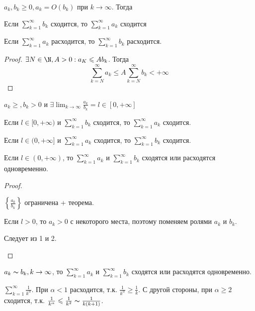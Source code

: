 \begin{Thm}
	$a_k, b_k \geqslant 0, a_k = O(b_k)$ при $k \to \infty$. Тогда
	\begin{MyList}
		\item Если $\sum_{k=1}^{\infty} b_k$ сходится, то $\sum_{k=1}^{\infty} a_k$ сходится
		\item Если $\sum_{k=1}^{\infty} a_k$ расходится, то $\sum_{k=1}^{\infty} b_k$ расходится.    
	\end{MyList} 
\end{Thm}

\begin{proof}
	$\exists N \in \N, A > 0 : a_K \leqslant A b_k$. Тогда
	\[\sum_{k=N}^{\infty} a_k \leqslant A \sum_{k=N}^{\infty} b_k < +\infty\] 
\end{proof}

\begin{Cons}
	$a_k \geqslant, b_k > 0$ и $\exists \lim_{k \to \infty} \frac{a_k}{b_k} = l \in [0, +\infty]$
	\begin{MyList}
		\item Если $l \in [0, +\infty)$ и $\sum_{k=1}^{\infty} b_k$ сходится, то $\sum_{k=1}^{\infty} a_k$ сходится.
		\item Если $l \in (0, +\infty]$ и $\sum_{k=1}^{\infty} a_k$ сходится, то $\sum_{k=1}^{\infty} b_k$ сходится.
		\item Если $l \in (0, +\infty)$, то $\sum_{k=1}^{\infty} a_k$ и $\sum_{k=1}^{\infty} b_k$ сходятся или расходятся одновременно.        
	\end{MyList} 
\end{Cons}

\begin{proof}
	\begin{MyList}
		\item $\left\{ \frac{a_k}{b_k}\right\}$ ограничена + теорема.
		\item Если $l > 0$, то $a_k > 0$ с некоторого места, поэтому поменяем ролями $a_k$ и $b_k$.
		\item Следует из 1 и 2.  
	\end{MyList}
\end{proof}

\begin{Cons}
	$a_k \thicksim b_k, k \to \infty$, то $\sum_{k=1}^{\infty} a_k$ и $\sum_{k=1}^{\infty} b_k$ сходятся или расходятся одновременно.   
\end{Cons}

\begin{Example}
	$\sum_{k=1}^{\infty} \frac{1}{k^\alpha}$. При $\alpha < 1$ расходится, т.к. $\frac{1}{k^\alpha} \geqslant \frac{1}{k}$.
	С другой стороны, при $\alpha \geqslant 2$ сходится, т.к. $\frac{1}{k^\alpha} \leqslant \frac{1}{k^2} \thicksim \frac{1}{k(k + 1)}$.
\end{Example}

